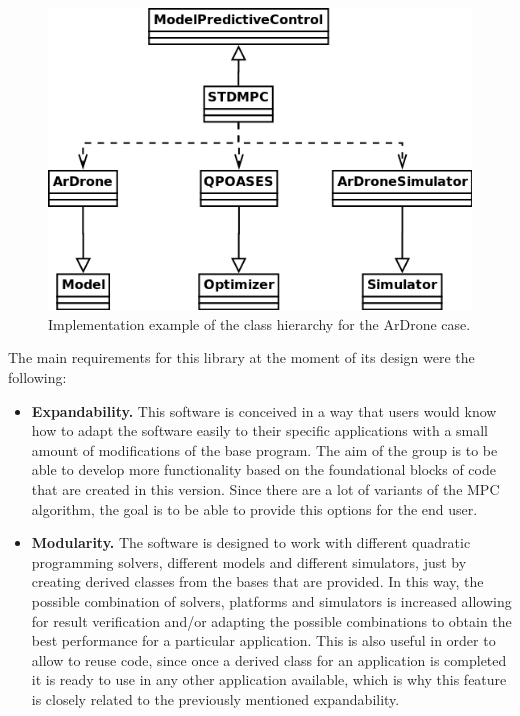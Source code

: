 \begin{figure}[H]
\centering
\includegraphics[scale=0.4]{Images/Chapter4/Class_diagram_implementation.png}
\caption{Implementation example of the class hierarchy for the ArDrone case.}
\label{fig:implementation_class_diagram}
\end{figure}

The main requirements for this library at the moment of its design were the following:

\begin{itemize}

\item \textbf{Expandability.} This software is conceived in a way that users would know how to adapt the software easily to their specific applications with a small amount of modifications of the base program. The aim of the group is to be able to develop more functionality based on the foundational blocks of code that are created in this version. Since there are a lot of variants of the MPC algorithm, the goal is to be able to provide this options for the end user. 

\item \textbf{Modularity.} The software is designed to work with different quadratic programming solvers, different models and different simulators, just by creating derived classes from the bases that are provided. In this way, the possible combination of solvers, platforms and simulators is increased allowing for result verification and/or adapting the possible combinations to obtain the best performance for a particular application. This is also useful in order to allow to reuse code, since once a derived class for an application is completed it is ready to use in any other application available, which is why this feature is closely related to the previously mentioned expandability.

\end{itemize}

